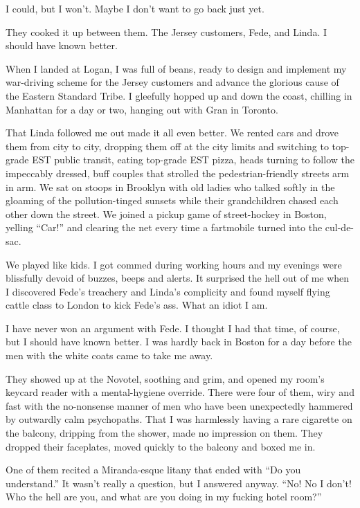 I could, but I won’t. Maybe I don’t want to go back just yet.

They cooked it up between them. The Jersey customers, Fede, and
Linda. I should have known better.

When I landed at Logan, I was full of beans, ready to design and
implement my war-driving scheme for the Jersey customers and
advance the glorious cause of the Eastern Standard Tribe. I
gleefully hopped up and down the coast, chilling in Manhattan for a
day or two, hanging out with Gran in Toronto.

That Linda followed me out made it all even better. We rented cars
and drove them from city to city, dropping them off at the city
limits and switching to top-grade EST public transit, eating
top-grade EST pizza, heads turning to follow the impeccably
dressed, buff couples that strolled the pedestrian-friendly streets
arm in arm. We sat on stoops in Brooklyn with old ladies who talked
softly in the gloaming of the pollution-tinged sunsets while their
grandchildren chased each other down the street. We joined a pickup
game of street-hockey in Boston, yelling “Car!” and clearing the
net every time a fartmobile turned into the cul-de-sac.

We played like kids. I got commed during working hours and my
evenings were blissfully devoid of buzzes, beeps and alerts. It
surprised the hell out of me when I discovered Fede’s treachery and
Linda’s complicity and found myself flying cattle class to London
to kick Fede’s ass. What an idiot I am.

I have never won an argument with Fede. I thought I had that time,
of course, but I should have known better. I was hardly back in
Boston for a day before the men with the white coats came to take
me away.

They showed up at the Novotel, soothing and grim, and opened my
room’s keycard reader with a mental-hygiene override. There were
four of them, wiry and fast with the no-nonsense manner of men who
have been unexpectedly hammered by outwardly calm psychopaths. That
I was harmlessly having a rare cigarette on the balcony, dripping
from the shower, made no impression on them. They dropped their
faceplates, moved quickly to the balcony and boxed me in.

One of them recited a Miranda-esque litany that ended with “Do you
understand.” It wasn’t really a question, but I answered anyway.
“No! No I don’t! Who the hell are you, and what are you doing in my
fucking hotel room?”

